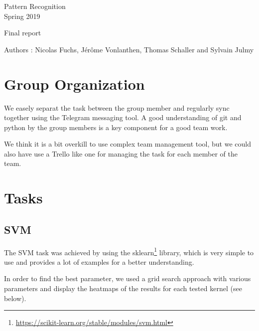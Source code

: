 \documentclass[a4paper,11pt]{report}
\date{\today}
\begin{document}
\begin{center}
  \large{
    Pattern Recognition\\
    Spring 2019
  }
  
  \noindent\makebox[\linewidth]{\rule{\linewidth}{0.4pt}}
  Final report
  \noindent\makebox[\linewidth]{\rule{\linewidth}{0.4pt}}

  \begin{flushleft}
    Authors : Nicolas Fuchs, Jérôme Vonlanthen, Thomas Schaller and Sylvain Julmy
  \end{flushleft}
  
  \noindent\makebox[\linewidth]{\rule{\textwidth}{1pt}}
\end{center}

\section*{Group Organization}

We easely separat the task between the group member and regularly sync together
using the Telegram messaging tool. A good understanding of git and python by the
group members is a key component for a good team work.

We think it is a bit overkill to use complex team management tool, but we could
also have use a Trello like one for managing the task for each member of the
team.

\section*{Tasks}

\subsection*{SVM}

The SVM task was achieved by using the
sklearn\footnote{\url{https://scikit-learn.org/stable/modules/svm.html}}
library, which is very simple to use and provides a lot of examples for a better
understanding.

In order to find the best parameter, we used a grid search approach with various
parameters and display the heatmaps of the results for each tested kernel (see below).
\end{document}
